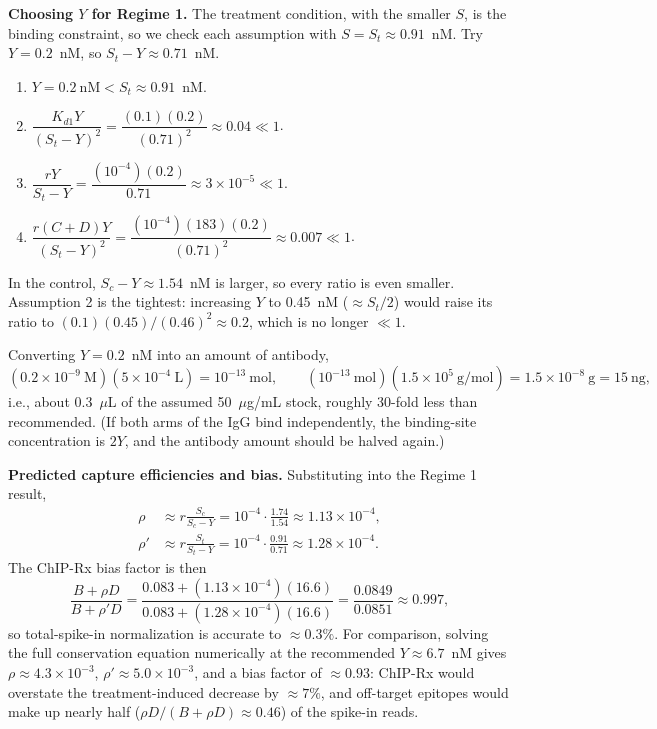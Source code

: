 \documentclass[11pt]{article}
\begin{document}
\textbf{Choosing $Y$ for Regime 1.} The treatment condition, with the
smaller $S$, is the binding constraint, so we check each assumption with
$S=S_t\approx0.91$~nM. Try $Y=0.2$~nM, so $S_t-Y\approx0.71$~nM.
\begin{enumerate}
    \item $Y=0.2~\text{nM}<S_t\approx0.91$~nM. \checkmark
    \item $\dfrac{K_{d1}Y}{(S_t-Y)^2}
    =\dfrac{(0.1)(0.2)}{(0.71)^2}
    \approx0.04\ll1$. \checkmark
    \item $\dfrac{rY}{S_t-Y}
    =\dfrac{(10^{-4})(0.2)}{0.71}
    \approx3\times10^{-5}\ll1$. \checkmark
    \item $\dfrac{r(C+D)Y}{(S_t-Y)^2}
    =\dfrac{(10^{-4})(183)(0.2)}{(0.71)^2}
    \approx0.007\ll1$. \checkmark
\end{enumerate}
In the control, $S_c-Y\approx1.54$~nM is larger, so every ratio is even
smaller. Assumption 2 is the tightest: increasing $Y$ to 0.45~nM
($\approx S_t/2$) would raise its ratio to
$(0.1)(0.45)/(0.46)^2\approx0.2$, which is no longer $\ll1$.

Converting $Y=0.2$~nM into an amount of antibody,
$$
(0.2\times10^{-9}~\text{M})(5\times10^{-4}~\text{L})
=10^{-13}~\text{mol},
\qquad
(10^{-13}~\text{mol})(1.5\times10^5~\text{g/mol})
=1.5\times10^{-8}~\text{g}
=15~\text{ng},
$$
i.e., about 0.3~$\mu$L of the assumed 50~$\mu$g/mL stock, roughly
30-fold less than recommended. (If both arms of the IgG bind
independently, the binding-site concentration is $2Y$, and the antibody
amount should be halved again.)

\textbf{Predicted capture efficiencies and bias.} Substituting into the
Regime 1 result,
$$\begin{aligned}
\rho&\approx r\frac{S_c}{S_c-Y}=10^{-4}\cdot\frac{1.74}{1.54}\approx1.13\times10^{-4}, \\
\rho'&\approx r\frac{S_t}{S_t-Y}=10^{-4}\cdot\frac{0.91}{0.71}\approx1.28\times10^{-4}.
\end{aligned}$$
The ChIP-Rx bias factor is then
$$
\frac{B+\rho D}{B+\rho'D}
=\frac{0.083+(1.13\times10^{-4})(16.6)}{0.083+(1.28\times10^{-4})(16.6)}
=\frac{0.0849}{0.0851}
\approx0.997,
$$
so total-spike-in normalization is accurate to $\approx0.3\%$. For
comparison, solving the full conservation equation numerically at the
recommended $Y\approx6.7$~nM gives $\rho\approx4.3\times10^{-3}$,
$\rho'\approx5.0\times10^{-3}$, and a bias factor of
$\approx0.93$: ChIP-Rx would overstate the treatment-induced decrease by
$\approx7\%$, and off-target epitopes would make up nearly half
($\rho D/(B+\rho D)\approx0.46$) of the spike-in reads.
\end{document}
